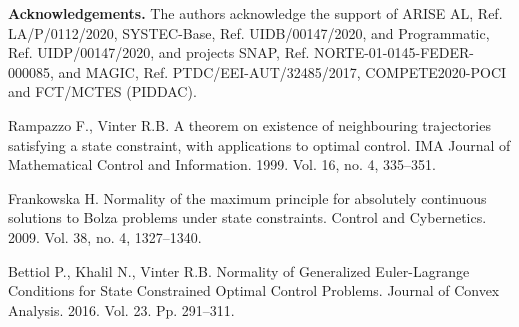 \documentclass[12pt]{llncs}
\begin{document}
{\small {\bf Acknowledgements.} The authors acknowledge the support of  ARISE AL, Ref. LA/P/0112/2020, SYSTEC-Base, Ref. UIDB/00147/2020, and Programmatic, Ref. UIDP/00147/2020, and projects SNAP, Ref. NORTE-01-0145-FEDER-000085, and MAGIC, Ref. PTDC/EEI-AUT/32485/2017, COMPETE2020-POCI and FCT/MCTES (PIDDAC)}.



\begin{thebibliography}{9}

Rampazzo  F., Vinter  R.B.  A theorem on existence of neighbouring trajectories satisfying a state constraint, with applications to optimal control. IMA Journal of Mathematical Control and Information. 1999. Vol. 16, no. 4, 335--351.

Frankowska  H.  Normality of the maximum principle for absolutely continuous solutions to Bolza problems under state constraints. Control and Cybernetics. 2009. Vol. 38, no. 4, 1327--1340.

Bettiol  P., Khalil  N., Vinter  R.B.  Normality of Generalized Euler-Lagrange Conditions for State Constrained Optimal Control Problems. Journal of Convex Analysis. 2016.  Vol. 23. Pp. 291--311.

\end{thebibliography}


\end{document}
